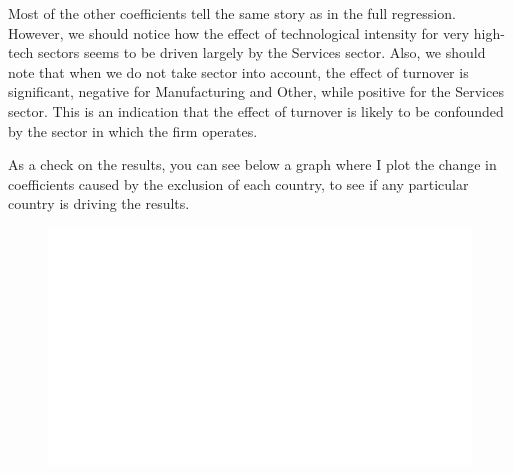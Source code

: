 \documentclass[12pt]{report}
\begin{document}
\par Most of the other coefficients tell the same story as in the full regression. However, we should notice how the effect of technological intensity for very high-tech sectors seems to be driven largely by the Services sector. Also, we should note that when we do not take sector into account, the effect of turnover is significant, negative for Manufacturing and Other, while positive for the Services sector. This is an indication that the effect of turnover is likely to be confounded by the sector in which the firm operates.

\par As a check on the results, you can see below a graph where I plot the change in coefficients caused by the exclusion of each country, to see if any particular country is driving the results.


\clearpage %

\begin{figure}
    \centering
    \includegraphics[width=\textwidth]{../Output/changes-in-coeff-nocountryeffects.pdf}
    \caption{}
    \label{fig:changes_in_coeff-nocountryeffects-BIGFORMAT}
\end{figure}
\end{document}
